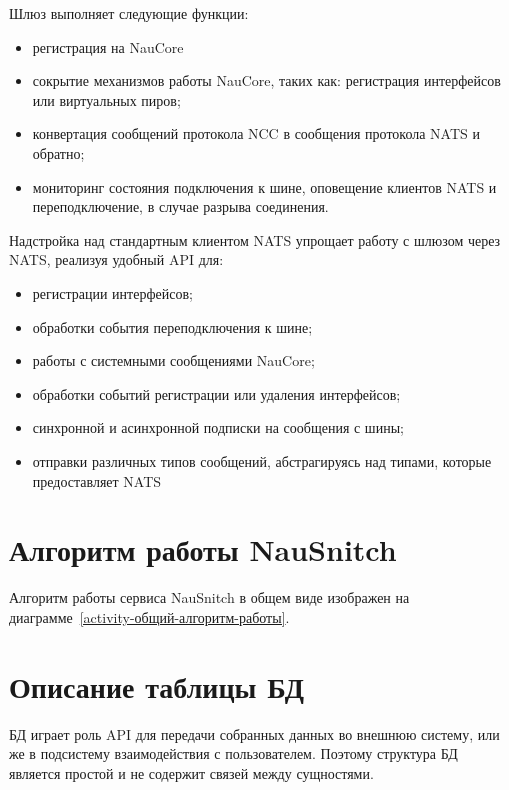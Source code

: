 Шлюз выполняет следующие функции:
\begin{itemize}
    \item регистрация на NauCore
    \item сокрытие механизмов работы NauCore, таких как: регистрация интерфейсов или виртуальных пиров;
    \item конвертация сообщений протокола NCC в сообщения протокола NATS и обратно; %
    \item мониторинг состояния подключения к шине, оповещение клиентов NATS и переподключение, в случае разрыва соединения. %
\end{itemize}


Надстройка над стандартным клиентом NATS упрощает работу с шлюзом через NATS,
реализуя удобный API для:
\begin{itemize}
    \item регистрации интерфейсов;
    \item обработки события переподключения к шине;
    \item работы с системными сообщениями NauCore;
    \item обработки событий регистрации или удаления интерфейсов;
    \item синхронной и асинхронной подписки на сообщения с шины;
    \item отправки различных типов сообщений, абстрагируясь над типами, которые предоставляет NATS\@
\end{itemize}

\section{Алгоритм работы NauSnitch}

Алгоритм работы сервиса NauSnitch в общем виде изображен на диаграмме~\ref{activity-общий-алгоритм-работы}.



\section{Описание таблицы БД} %

БД играет роль API для передачи собранных данных во внешнюю систему,
или же в подсистему взаимодействия с пользователем.
Поэтому структура БД является простой и не содержит связей между сущностями.

